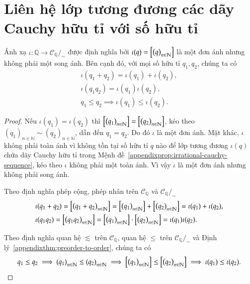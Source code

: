 \section{Liên hệ lớp tương đương các dãy Cauchy hữu tỉ với số hữu tỉ}

\begin{appendixthm}\label{appendixthm:embed-Q-into-quotient-set-of-rational-cauchy-sequences}
    Ánh xạ $\iota: \mathbb{Q}\to \mathscr{C}_{\mathbb{Q}}/_{\sim}$ được định nghĩa bởi $\iota(q) = \left[{\left({q}\right)}_{{n}\in\mathbb{N}}\right]$ là một đơn ánh nhưng không phải một song ánh. Bên cạnh đó, với mọi số hữu tỉ $q_{1}, q_{2}$, chúng ta có
    \[
        \begin{split}
            \iota(q_{1} + q_{2}) = \iota(q_{1}) + \iota(q_{2}), \\
            \iota(q_{1}q_{2}) = \iota(q_{1})\iota(q_{2}), \\
            q_{1}\leq q_{2} \implies \iota(q_{1})\leq \iota(q_{2}).
        \end{split}
    \]
\end{appendixthm}

\begin{proof}
    Nếu $\iota(q_{1}) = \iota(q_{2})$ thì $\left[{\left({q_{1}}\right)}_{{n}\in\mathbb{N}}\right] = \left[{\left({q_{2}}\right)}_{{n}\in\mathbb{N}}\right]$, kéo theo ${(q_{1})}_{n\in\mathbb{N}}\sim {(q_{2})}_{n\in\mathbb{N}}$, dẫn đến $q_{1} = q_{2}$. Do đó $\iota$ là một đơn ánh. Mặt khác, $\iota$ không phải toàn ánh vì không tồn tại số hữu tỉ $q$ nào để lớp tương đương $\iota(q)$ chứa dãy Cauchy hữu tỉ trong Mệnh đề~\ref{appendixprop:irrational-cauchy-sequence}, kéo theo $\iota$ không phải một toàn ánh. Vì vậy $\iota$ là một đơn ánh nhưng không phải song ánh.

    Theo định nghĩa phép cộng, phép nhân trên $\mathscr{C}_{\mathbb{Q}}$ và $\mathscr{C}_{\mathbb{Q}}/_{\sim}$
    \begin{align*}
         & \iota(q_{1} + q_{2}) = \left[{\left({q_{1} + q_{2}}\right)}_{{n}\in\mathbb{N}}\right] = \left[{\left({q_{1}}\right)}_{{n}\in\mathbb{N}}\right] + \left[{\left({q_{2}}\right)}_{{n}\in\mathbb{N}}\right] = \iota(q_{1}) + \iota(q_{2}), \\
         & \iota(q_{1}q_{2}) = \left[{\left({q_{1}q_{2}}\right)}_{{n}\in\mathbb{N}}\right] = \left[{\left({q_{1}}\right)}_{{n}\in\mathbb{N}}\right]\cdot\left[{\left({q_{2}}\right)}_{{n}\in\mathbb{N}}\right] = \iota(q_{1})\iota(q_{2}).
    \end{align*}

    Theo định nghĩa quan hệ $\lesssim$ trên $\mathscr{C}_{\mathbb{Q}}$, quan hệ $\leq$ trên $\mathscr{C}_{\mathbb{Q}}/_{\sim}$ và Định lý~\ref{appendixthm:preorder-to-order}, chúng ta có
    \[
        q_{1}\leq q_{2} \implies {(q_{1})}_{n\in\mathbb{N}}\lesssim {(q_{2})}_{n\in\mathbb{N}} \implies \left[{\left({q_{1}}\right)}_{{n}\in\mathbb{N}}\right] \leq \left[{\left({q_{2}}\right)}_{{n}\in\mathbb{N}}\right] \implies \iota(q_{1}) \leq \iota(q_{2}).
    \]
\end{proof}

